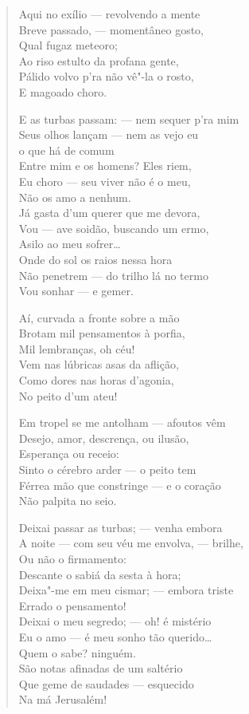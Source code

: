 \begin{verse}
Aqui no exílio --- revolvendo a mente\\
Breve passado, --- momentâneo gosto,\\
Qual fugaz meteoro;\\
Ao riso estulto da profana gente,\\
Pálido volvo p'ra não vê"-la o rosto,\\
E magoado choro.

E as turbas passam: --- nem sequer p'ra mim\\
Seus olhos lançam --- nem as vejo eu\\
o que há de comum\\
Entre mim e os homens? Eles riem,\\
Eu choro --- seu viver não é o meu,\\
Não os amo a nenhum.\\
Já gasta d'um querer que me devora,\\
Vou --- ave soidão, buscando um ermo,\\
Asilo ao meu sofrer\ldots{}\\
Onde do sol os raios nessa hora\\
Não penetrem --- do trilho lá no termo\\
Vou sonhar --- e gemer.

Aí, curvada a fronte sobre a mão\\
Brotam mil pensamentos à porfia,\\
Mil lembranças, oh céu!\\
Vem nas lúbricas asas da aflição,\\
Como dores nas horas d'agonia,\\
No peito d'um ateu!

Em tropel se me antolham --- afoutos vêm\\
Desejo, amor, descrença, ou ilusão,\\
Esperança ou receio:\\
Sinto o cérebro arder --- o peito tem\\
Férrea mão que constringe --- e o coração\\
Não palpita no seio.

Deixai passar as turbas; --- venha embora\\
A noite --- com seu véu me envolva, --- brilhe,\\
Ou não o firmamento:\\
Descante o sabiá da sesta à hora;\\
Deixa"-me em meu cismar; --- embora triste\\
Errado o pensamento!\\
Deixai o meu segredo; --- oh! é mistério\\
Eu o amo --- é meu sonho tão querido\ldots{}\\
Quem o sabe? ninguém.\\
São notas afinadas de um saltério\\
Que geme de saudades --- esquecido\\
Na má Jerusalém!


\end{verse}
